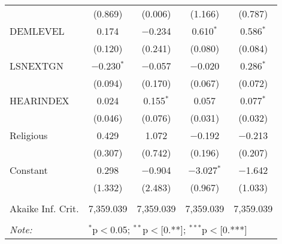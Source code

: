 \begin{table}[!htbp]
\begin{tabular}{@{\extracolsep{1pt}}lcccc}
  & (0.869) & (0.006) & (1.166) & (0.787) \\ 
  DEMLEVEL & 0.174 & $-$0.234 & 0.610$^{*}$ & 0.586$^{*}$ \\ 
  & (0.120) & (0.241) & (0.080) & (0.084) \\ 
  LSNEXTGN & $-$0.230$^{*}$ & $-$0.057 & $-$0.020 & 0.286$^{*}$ \\ 
  & (0.094) & (0.170) & (0.067) & (0.072) \\ 
  HEARINDEX & 0.024 & 0.155$^{*}$ & 0.057 & 0.077$^{*}$ \\ 
  & (0.046) & (0.076) & (0.031) & (0.032) \\ 
  Religious & 0.429 & 1.072 & $-$0.192 & $-$0.213 \\ 
  & (0.307) & (0.742) & (0.196) & (0.207) \\ 
  Constant & 0.298 & $-$0.904 & $-$3.027$^{*}$ & $-$1.642 \\ 
  & (1.332) & (2.483) & (0.967) & (1.033) \\ 
 \hline \\[-1.8ex] 
Akaike Inf. Crit. & 7,359.039 & 7,359.039 & 7,359.039 & 7,359.039 \\ 
\hline 
\hline \\[-1.8ex] 
\textit{Note:}  & \multicolumn{4}{l}{$^{*}$p$<$0.05; $^{**}$p$<$[0.**]; $^{***}$p$<$[0.***]} \\ 
\end{tabular} 
\end{table} 
